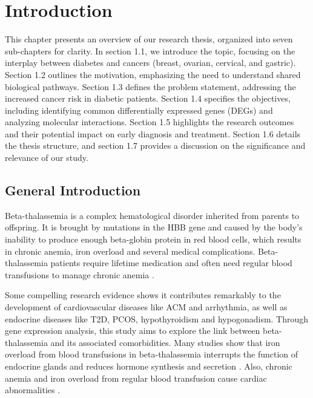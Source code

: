 %
%
\let\textcircled=\pgftextcircled
\chapter{Introduction}
\label{chap:intro}

This chapter presents an overview of our research thesis, organized into seven sub-chapters for clarity. In section 1.1, we introduce the topic, focusing on the interplay between diabetes and cancers (breast, ovarian, cervical, and gastric). Section 1.2 outlines the motivation, emphasizing the need to understand shared biological pathways. Section 1.3 defines the problem statement, addressing the increased cancer risk in diabetic patients. Section 1.4 specifies the objectives, including identifying common differentially expressed genes (DEGs) and analyzing molecular interactions. Section 1.5 highlights the research outcomes and their potential impact on early diagnosis and treatment. Section 1.6 details the thesis structure, and section 1.7 provides a discussion on the significance and relevance of our study.

\vspace{20mm}

\section{General Introduction}
\label{sec:sec1_1}
Beta-thalassemia is a complex hematological disorder inherited from parents to offspring. It is brought by mutations in the HBB gene and caused by the body’s inability to produce enough beta-globin protein in red blood cells, which results in chronic anemia, iron overload and several medical complications. Beta-thalassemia patients require lifetime medication and often need regular blood transfusions to manage chronic anemia \cite{b1}.

Some compelling research evidence shows it contributes remarkably to the development of cardiovascular diseases like ACM and arrhythmia, as well as endocrine diseases like T2D, PCOS, hypothyroidism and hypogonadism. Through gene expression analysis, this study aims to explore the link between beta-thalassemia and its associated comorbidities. Many studies show that iron overload from blood transfusions in beta-thalassemia interrupts the function of endocrine glands and reduces hormone synthesis and secretion \cite{b1}. Also, chronic anemia and iron overload from regular blood transfusion cause cardiac abnormalities \cite{b2}.

